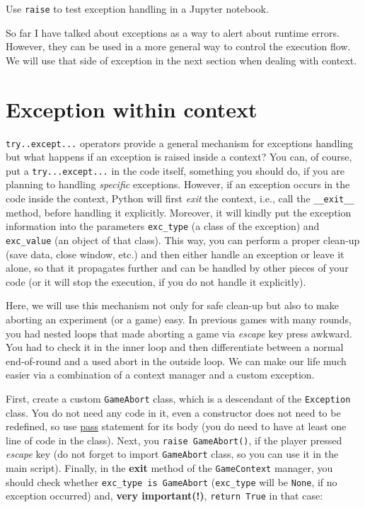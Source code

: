 \documentclass[
]{book}
\begin{document}
Use \texttt{raise} to test exception handling in a Jupyter notebook.

So far I have talked about exceptions as a way to alert about runtime errors. However, they can be used in a more general way to control the execution flow. We will use that side of exception in the next section when dealing with context.

\hypertarget{exception-within-context}{%
\section{Exception within context}\label{exception-within-context}}

\texttt{try..except...} operators provide a general mechanism for exceptions handling but what happens if an exception is raised inside a context? You can, of course, put a \texttt{try...except...} in the code itself, something you should do, if you are planning to handling \emph{specific} exceptions. However, if an exception occurs in the code inside the context, Python will first \emph{exit} the context, i.e., call the \texttt{\_\_exit\_\_} method, before handling it explicitly. Moreover, it will kindly put the exception information into the parameters \texttt{exc\_type} (a class of the exception) and \texttt{exc\_value} (an object of that class). This way, you can perform a proper clean-up (save data, close window, etc.) and then either handle an exception or leave it alone, so that it propagates further and can be handled by other pieces of your code (or it will stop the execution, if you do not handle it explicitly).

Here, we will use this mechanism not only for safe clean-up but also to make aborting an experiment (or a game) easy. In previous games with many rounds, you had nested loops that made aborting a game via \emph{escape} key press awkward. You had to check it in the inner loop and then differentiate between a normal end-of-round and a used abort in the outside loop. We can make our life much easier via a combination of a context manager and a custom exception.

First, create a custom \texttt{GameAbort} class, which is a descendant of the \texttt{Exception} class. You do not need any code in it, even a constructor does not need to be redefined, so use \href{https://docs.python.org/3/reference/simple_stmts.html\#the-pass-statement}{pass} statement for its body (you do need to have at least one line of code in the class). Next, you \texttt{raise\ GameAbort()}, if the player pressed \emph{escape} key (do not forget to import \texttt{GameAbort} class, so you can use it in the main script). Finally, in the \textbf{exit} method of the \texttt{GameContext} manager, you should check whether \texttt{exc\_type\ is\ GameAbort} (\texttt{exc\_type} will be \texttt{None}, if no exception occurred) and, \textbf{very important(!)}, \texttt{return\ True} in that case:
\end{document}

